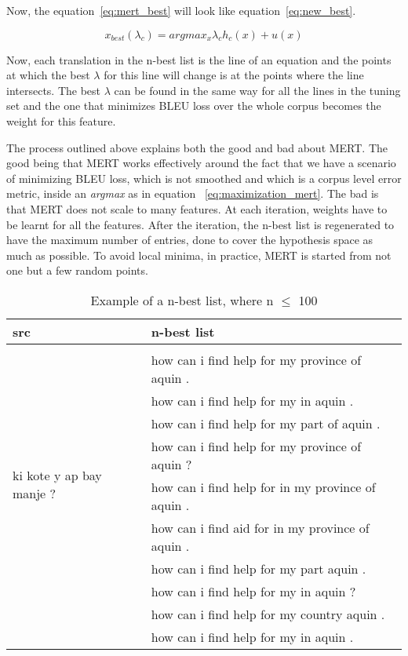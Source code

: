 Now, the equation~\eqref{eq:mert_best} will look like equation~\eqref{eq:new_best}. 

\begin{equation} \label{eq:new_best}
	x_{best}(\lambda_{c}) = argmax_{x} \lambda_{c}h_{c}(x) + u(x)
\end{equation} 

Now, each translation in the n-best list is the line of an equation and the points at which the best $\lambda$ for this line will change is at the points where the line intersects. The best $\lambda$ can be found in the same way for all the lines in the tuning set and the one that minimizes BLEU loss over the whole corpus becomes the weight for this feature. 

The process outlined above explains both the good and bad about MERT. The good being that MERT works effectively around the fact that we have a scenario of minimizing BLEU loss, which is not smoothed and which is a corpus level error metric, inside an \emph{argmax} as in equation ~\eqref{eq:maximization_mert}. The bad is that MERT does not scale to many features. At each iteration, weights have to be learnt for all the features. After the iteration, the n-best list is regenerated to have the maximum number of entries, done to cover the hypothesis space as much as possible. To avoid local minima, in practice, MERT is started from not one but a few random points.



\begin{table*}
	\begin{tabular}{p{}p{}}
		\toprule
		src & n-best list \\
		\toprule
		\multirow{10}{*}{ki kote y ap bay manje ?}  & \\ 
		& how can i find help for my province of aquin . \\
		& how can i find help for my in aquin . \\
		& how can i find help for my part of aquin . \\
		& how can i find help for my province of aquin ? \\
		& how can i find help for in my province of aquin . \\
		& how can i find aid for in my province of aquin . \\
		& how can i find help for my part aquin . \\
		& how can i find help for my in aquin ?  \\
		& how can i find help for my country aquin . \\
		& how can i find help for my in aquin . \\
		\bottomrule
	\end{tabular}
	\caption{Example of a n-best list, where n $\leq$ 100}
	\label{table:nbest}
\end{table*}




